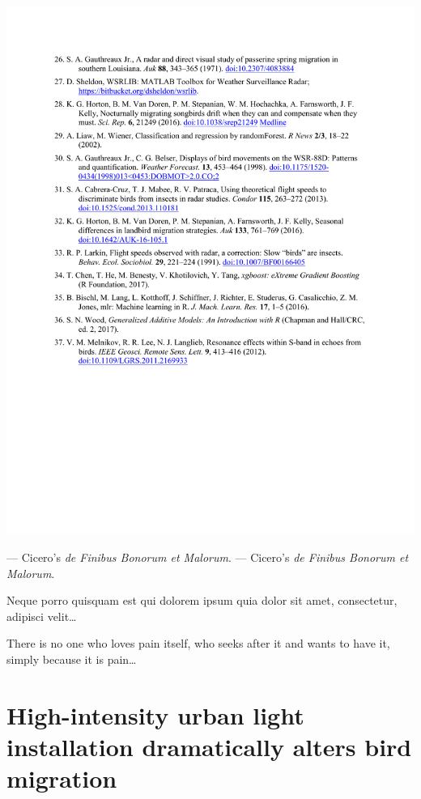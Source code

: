 \documentclass[a4paper, twoside]{templates/ociamthesis}
\begin{document}
\includegraphics[width=1\linewidth]{pdf_chapters/forecast/forecast_supp_crop_Part18}

--- Cicero's \emph{de Finibus Bonorum et Malorum}. --- Cicero's \emph{de Finibus Bonorum et Malorum}.

\begin{savequote}
Neque porro quisquam est qui dolorem ipsum quia dolor sit amet,
consectetur, adipisci velit\ldots{}

There is no one who loves pain itself, who seeks after it and wants to
have it, simply because it is pain\ldots{}
\end{savequote}

\hypertarget{high-intensity-lights}{%
\chapter{High-intensity urban light installation dramatically alters bird migration}\label{high-intensity-lights}}
\end{document}
